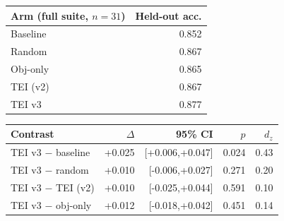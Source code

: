 \begin{tabular}{lr}
\toprule
Arm (full suite, $n=31$) & Held-out acc. \\
\midrule
Baseline & 0.852 \\
Random & 0.867 \\
Obj-only & 0.865 \\
TEI (v2) & 0.867 \\
TEI v3 & 0.877 \\
\bottomrule
\end{tabular}

\vspace{4pt}

\begin{tabular}{lrrrr}
\toprule
Contrast & $\Delta$ & 95\% CI & $p$ & $d_z$ \\
\midrule
TEI v3 $-$ baseline & +0.025 & [+0.006,+0.047] & 0.024 & 0.43 \\
TEI v3 $-$ random & +0.010 & [-0.006,+0.027] & 0.271 & 0.20 \\
TEI v3 $-$ TEI (v2) & +0.010 & [-0.025,+0.044] & 0.591 & 0.10 \\
TEI v3 $-$ obj-only & +0.012 & [-0.018,+0.042] & 0.451 & 0.14 \\
\bottomrule
\end{tabular}